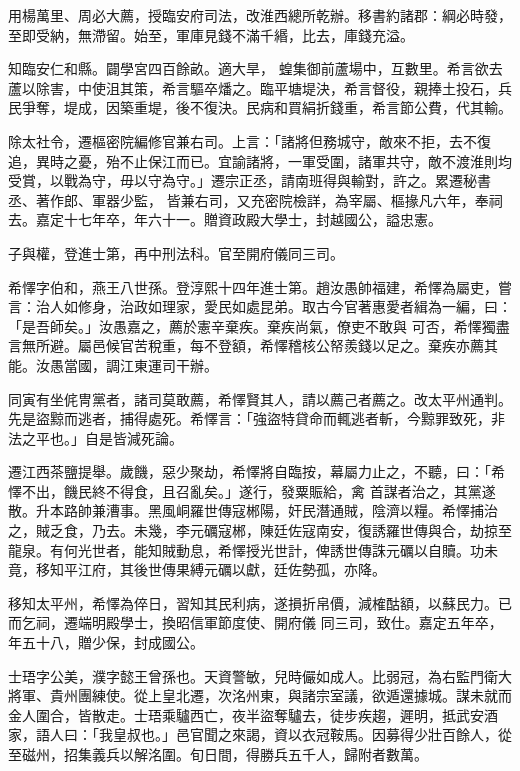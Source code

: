 \begin{pinyinscope}
 用楊萬里、周必大薦，授臨安府司法，改淮西總所乾辦。移書約諸郡：綱必時發，至即受納，無滯留。始至，軍庫見錢不滿千緡，比去，庫錢充溢。



 知臨安仁和縣。闢學宮四百餘畝。適大旱，
 蝗集御前蘆場中，互數里。希言欲去蘆以除害，中使沮其策，希言驅卒燔之。臨平塘堤決，希言督役，親捧土投石，兵民爭奪，堤成，因築重堤，後不復決。民病和買絹折錢重，希言節公費，代其輸。



 除太社令，遷樞密院編修官兼右司。上言：「諸將但務城守，敵來不拒，去不復追，異時之憂，殆不止保江而已。宜諭諸將，一軍受圍，諸軍共守，敵不渡淮則均受賞，以戰為守，毋以守為守。」遷宗正丞，請南班得與輸對，許之。累遷秘書丞、著作郎、軍器少監，
 皆兼右司，又充密院檢詳，為宰屬、樞掾凡六年，奉祠去。嘉定十七年卒，年六十一。贈資政殿大學士，封越國公，謚忠憲。



 子與權，登進士第，再中刑法科。官至開府儀同三司。



 希懌字伯和，燕王八世孫。登淳熙十四年進士第。趙汝愚帥福建，希懌為屬吏，嘗言：治人如修身，治政如理家，愛民如處昆弟。取古今官著惠愛者緝為一編，曰：「是吾師矣。」汝愚嘉之，薦於憲辛棄疾。棄疾尚氣，僚吏不敢與
 可否，希懌獨盡言無所避。屬邑候官苦稅重，每不登額，希懌稽核公帑羨錢以足之。棄疾亦薦其能。汝愚當國，調江東運司干辦。



 同寅有坐侂冑黨者，諸司莫敢薦，希懌賢其人，請以薦己者薦之。改太平州通判。先是盜黥而逃者，捕得處死。希懌言：「強盜特貸命而輒逃者斬，今黥罪致死，非法之平也。」自是皆減死論。



 遷江西茶鹽提舉。歲饑，惡少聚劫，希懌將自臨按，幕屬力止之，不聽，曰：「希懌不出，饑民終不得食，且召亂矣。」遂行，發粟賑給，禽
 首謀者治之，其黨遂散。升本路帥兼漕事。黑風峒羅世傳寇郴陽，奸民潛通賊，陰濟以糧。希懌捕治之，賊乏食，乃去。未幾，李元礪寇郴，陳廷佐寇南安，復誘羅世傳與合，劫掠至龍泉。有何光世者，能知賊動息，希懌授光世計，俾誘世傳誅元礪以自贖。功未竟，移知平江府，其後世傳果縛元礪以獻，廷佐勢孤，亦降。



 移知太平州，希懌為倅日，習知其民利病，遂損折帛價，減榷酤額，以蘇民力。已而乞祠，遷端明殿學士，換昭信軍節度使、開府儀
 同三司，致仕。嘉定五年卒，年五十八，贈少保，封成國公。



 士珸字公美，濮字懿王曾孫也。天資警敏，兒時儼如成人。比弱冠，為右監門衛大將軍、貴州團練使。從上皇北遷，次洺州東，與諸宗室議，欲遁還據城。謀未就而金人圍合，皆散走。士珸乘驢西亡，夜半盜奪驢去，徒步疾趨，遲明，抵武安酒家，語人曰：「我皇叔也。」邑官聞之來謁，資以衣冠鞍馬。因募得少壯百餘人，從至磁州，招集義兵以解洺圍。旬日間，得勝兵五千人，歸附者數萬。




\end{pinyinscope}
